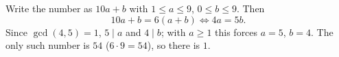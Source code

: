 Write the number as $10a+b$ with $1\le a\le9$, $0\le b\le9$. Then
\[10a+b=6(a+b)\iff4a=5b .\]
Since $\gcd(4,5)=1$, $5\mid a$ and $4\mid b$; with $a\ge1$ this forces $a=5$, $b=4$. The only such number is $54$ ($6\cdot9=54$), so there is $\boxed{1}$.
